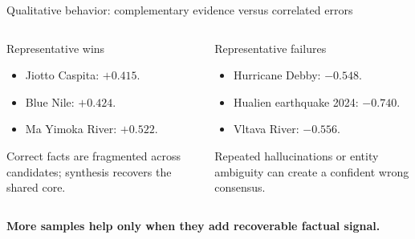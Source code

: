 \documentclass[aspectratio=169,10pt]{beamer}
\begin{document}
\begin{frame}{Qualitative behavior: complementary evidence versus correlated errors}
  \begin{columns}[T,onlytextwidth]
      \begin{block}{Representative wins}\small
        \begin{itemize}
          \item Jiotto Caspita: $+0.415$.
          \item Blue Nile: $+0.424$.
          \item Ma Yimoka River: $+0.522$.
        \end{itemize}
        \vspace{3pt}
        Correct facts are fragmented across candidates; synthesis recovers the shared core.
      \end{block}
      \begin{alertblock}{Representative failures}\small
        \begin{itemize}
          \item Hurricane Debby: $-0.548$.
          \item Hualien earthquake 2024: $-0.740$.
          \item Vltava River: $-0.556$.
        \end{itemize}
        \vspace{3pt}
        Repeated hallucinations or entity ambiguity can create a confident wrong consensus.
      \end{alertblock}
  \end{columns}
  \vfill
  \centering
  \textbf{More samples help only when they add recoverable factual signal.}
\end{frame}
\end{document}
